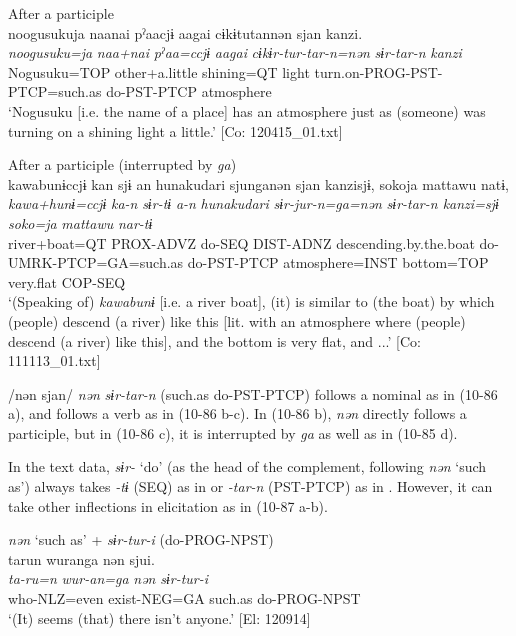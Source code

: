 \begin{xlist}
  \ex After a participle\\

      \glll    noogusukuja  naanai  pˀaacjɨ  aagai  cɨkɨtutannən  sjan  {\textbar}kanzi{\textbar}.\\
    \textit{noogusuku=ja}  \textit{naa+nai}  \textit{pˀaa=ccjɨ}  \textit{aagai}  \textit{cɨkɨr-tur-tar-n=nən}  \textit{sɨr-tar-n}  \textit{kanzi}\\
    Nogusuku=TOP  other+a.little  shining=QT  light turn.on-PROG-PST-PTCP=such.as  do-PST-PTCP  atmosphere\\
\glt     ‘Nogusuku [i.e. the name of a place] has an atmosphere just as (someone) was turning on a shining light a little.’  [Co: 120415\_01.txt]

  \ex After a participle (interrupted by \textit{ga})\\

      \glll    {\textbar}kawa{\textbar}bunɨccjɨ  kan  sjɨ  an  {\textbar}hunakudari{\textbar}  sjunganən  sjan  {\textbar}kanzi{\textbar}sjɨ,  {\textbar}soko{\textbar}ja   mattawu  natɨ,\\
    \textit{kawa+hunɨ=ccjɨ}  \textit{ka-n}  \textit{sɨr-tɨ}  \textit{a-n}  \textit{hunakudari}  \textit{sɨr-jur-n=ga=nən}  \textit{sɨr{}-tar-n  kanzi=sjɨ  soko=ja}  \textit{mattawu}  \textit{nar-tɨ}\\
    river+boat=QT  PROX-ADVZ  do-SEQ  DIST-ADNZ  descending.by.the.boat do-UMRK-PTCP=GA=such.as  do-PST-PTCP  atmosphere=INST  bottom=TOP  very.flat  COP-SEQ    \\
    \glt     ‘(Speaking of) \textit{kawabunɨ} [i.e. a river boat], (it) is similar to (the boat) by which (people) descend (a river) like this [lit. with an atmosphere where (people) descend (a river) like this], and the bottom is very flat, and ...’  [Co: 111113\_01.txt]
    \z
\z

/nən sjan/ \textit{nən} \textit{sɨr-tar-n} (such.as do-PST-PTCP) follows a nominal as in (10-86 a), and follows a verb as in (10-86 b-c). In (10-86 b), \textit{nən} directly follows a participle, but in (10-86 c), it is interrupted by \textit{ga} as well as in (10-85 d).

  In the text data, \textit{sɨr-} ‘do’ (as the head of the complement, following \textit{nən} ‘such as’) always takes \textit{{}-tɨ} (SEQ) as in  or \textit{{}-tar-n} (PST-PTCP) as in . However, it can take other inflections in elicitation as in (10-87 a-b).

\ea\label{ex:10.87}   
\ea \textit{nən} ‘such as’ + \textit{sɨr-tur-i} (do-PROG-NPST)\\
      \glll    tarun  wuranga  nən  sjui.\\
    \textit{ta-ru=n}  \textit{wur-an=ga}  \textit{nən}  \textit{sɨr-tur-i}\\
    who-NLZ=even  exist-NEG=GA  such.as  do-PROG-NPST\\
    \glt     ‘(It) seems (that) there isn’t anyone.’ [El: 120914]


\end{xlist}

